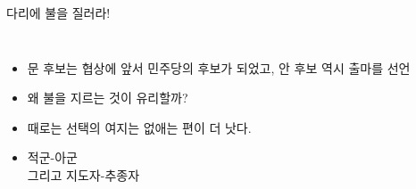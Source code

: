 \documentclass[final]{beamer}
\begin{document}
\begin{frame}[t]{다리에 불을 질러라!}
	\begin{columns}[c]
		\begin{itemize}
			\item 문 후보는 협상에 앞서 민주당의 후보가 되었고, 안 후보 역시 출마를 선언
			\item 왜 불을 지르는 것이 유리할까?
			\item 때로는 선택의 여지는 없애는 편이 더 낫다. 
			\item 적군-아군 \\ 그리고 지도자-추종자
		\end{itemize}
	\end{columns}
\end{frame}
\end{document}

